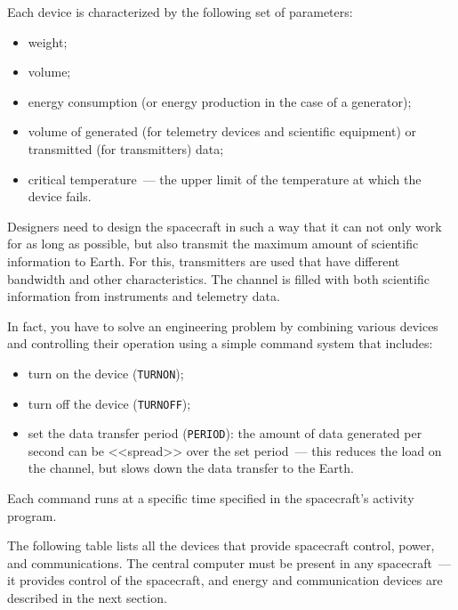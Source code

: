 \documentclass[12pt,a4paper]{article}
\begin{document}
Each device is characterized by the following set of parameters:

\begin{itemize}
\item weight;
\item volume;
\item energy consumption (or energy production in the case of a generator);
\item volume of generated (for telemetry devices and scientific equipment) or transmitted (for transmitters) data;
\item critical temperature~--- the upper limit of the temperature at which the device fails.
\end{itemize}

Designers need to design the spacecraft in such a way that it can not only work for as long as possible, but also transmit the maximum amount of scientific information to Earth. For this, transmitters are used that have different bandwidth and other characteristics. The channel is filled with both scientific information from instruments and telemetry data.

In fact, you have to solve an engineering problem by combining various devices and controlling their operation using a simple command system that includes:

\begin{itemize}
\item turn on the device (\verb'TURNON');
\item turn off the device (\verb'TURNOFF');
\item set the data transfer period (\verb'PERIOD'): the amount of data generated per second can be <<spread>> over the set period~--- this reduces the load on the channel, but slows down the data transfer to the Earth.
\end{itemize}

Each command runs at a specific time specified in the spacecraft's activity program.

The following table lists all the devices that provide spacecraft control, power, and communications. The central computer must be present in any spacecraft~--- it provides control of the spacecraft, and energy and communication devices are described in the next section.
\end{document}
